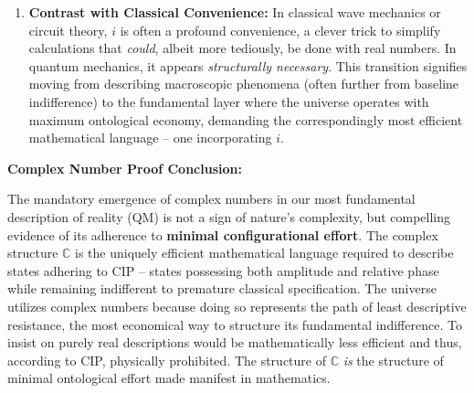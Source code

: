 \documentclass[11pt, a4paper]{article}
\begin{document}
\begin{enumerate}
    \item \textbf{Contrast with Classical Convenience:} In classical wave mechanics or circuit theory, $i$ is often a profound convenience, a clever trick to simplify calculations that \textit{could}, albeit more tediously, be done with real numbers. In quantum mechanics, it appears \textit{structurally necessary}. This transition signifies moving from describing macroscopic phenomena (often further from baseline indifference) to the fundamental layer where the universe operates with maximum ontological economy, demanding the correspondingly most efficient mathematical language – one incorporating $i$.
\end{enumerate}
\textbf{Complex Number Proof Conclusion:}

The mandatory emergence of complex numbers in our most fundamental description of reality (QM) is not a sign of nature's complexity, but compelling evidence of its adherence to \textbf{minimal configurational effort}. The complex structure $\mathbb{C}$ is the uniquely efficient mathematical language required to describe states adhering to CIP – states possessing both amplitude and relative phase while remaining indifferent to premature classical specification. The universe utilizes complex numbers because doing so represents the path of least descriptive resistance, the most economical way to structure its fundamental indifference. To insist on purely real descriptions would be mathematically less efficient and thus, according to CIP, physically prohibited. The structure of $\mathbb{C}$ \textit{is} the structure of minimal ontological effort made manifest in mathematics.

\clearpage
\end{document}
